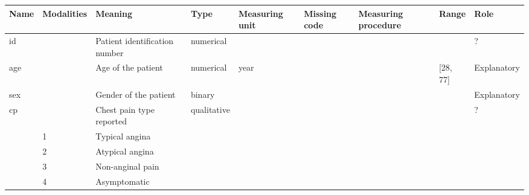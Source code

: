 \documentclass[a4paper,12pt]{article}
\begin{document}
\begin{adjustbox}{width=1\textwidth}
\begin{tabular}{|l|l|l|l|l|l|l|l|l|}
\hline

\textbf{Name} &\textbf{Modalities} & \textbf{Meaning}                                           &\textbf{Type} &\textbf{Measuring unit} &\textbf{Missing code} &\textbf{Measuring procedure}           &\textbf{Range} &\textbf{Role} \\ \hline
id            &                    & Patient identification number                              & numerical    &                        &                      &                                       &               & ?            \\ \hline
age           &                    & Age of the patient                                         & numerical    & year                   &                      &                                       & [28, 77]      & Explanatory  \\ \hline
sex           &                    & Gender of the patient                                      & binary       &                        &                      &                                       &               & Explanatory  \\ \hline
cp            &                    & Chest pain type reported                                   & qualitative  &                        &                      &                                       &               & ?            \\ \hline
              & 1                  & Typical angina                                             &              &                        &                      &                                       &               &              \\ \hline
              & 2                  & Atypical angina                                            &              &                        &                      &                                       &               &              \\ \hline
              & 3                  & Non-anginal pain                                           &              &                        &                      &                                       &               &              \\ \hline
              & 4                  & Asymptomatic                                               &              &                        &                      &                                       &               &              \\ \hline

\end{tabular}
\end{adjustbox}
\end{document}
